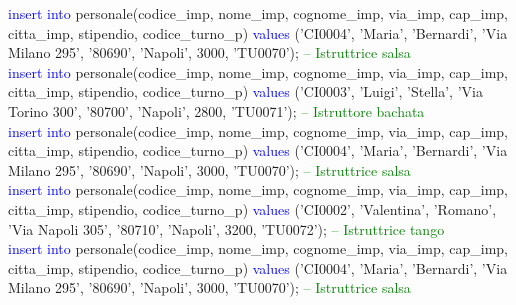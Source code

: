 \documentclass{article}
\begin{document}
\begin{flushleft}
{        \vspace{2mm}
        \hspace*{0.5em}\textcolor{blue}{insert into} personale(codice\_imp, nome\_imp, cognome\_imp, via\_imp, cap\_imp, \hspace*{0.5em}citta\_imp, stipendio, codice\_turno\_p) \textcolor{blue}{values} ('CI0004', 'Maria', 'Bernardi', 'Via\hspace*{0.5em} Milano 295', \hspace*{0.5em}'80690', 'Napoli', 3000, 'TU0070'); \hspace*{0.5em} \textcolor{green}{-- Istruttrice salsa} \\
        \hspace*{0.5em}\textcolor{blue}{insert into} personale(codice\_imp, nome\_imp, cognome\_imp, via\_imp, cap\_imp, \hspace*{0.5em}citta\_imp, stipendio, codice\_turno\_p) \textcolor{blue}{values} ('CI0003', 'Luigi', 'Stella', 'Via Torino 300', \hspace*{0.5em}'80700', 'Napoli', 2800, 'TU0071'); \hspace*{0.5em} \textcolor{green}{-- Istruttore bachata} \\
        \vspace{2mm}
        \hspace*{0.5em}\textcolor{blue}{insert into} personale(codice\_imp, nome\_imp, cognome\_imp, via\_imp, cap\_imp, \hspace*{0.5em}citta\_imp, stipendio, codice\_turno\_p) \textcolor{blue}{values} ('CI0004', 'Maria', 'Bernardi', 'Via\hspace*{0.5em} Milano 295', \hspace*{0.5em}'80690', 'Napoli', 3000, 'TU0070'); \hspace*{0.5em} \textcolor{green}{-- Istruttrice salsa} \\
        \hspace*{0.5em}\textcolor{blue}{insert into} personale(codice\_imp, nome\_imp, cognome\_imp, via\_imp, cap\_imp, \hspace*{0.5em}citta\_imp, stipendio, codice\_turno\_p) \textcolor{blue}{values} ('CI0002', 'Valentina', 'Romano', 'Via Napoli 305', \hspace*{0.5em}'80710', 'Napoli', 3200, 'TU0072'); \hspace*{0.5em} \textcolor{green}{-- Istruttrice tango} \\
        \vspace{2mm}
        \hspace*{0.5em}\textcolor{blue}{insert into} personale(codice\_imp, nome\_imp, cognome\_imp, via\_imp, cap\_imp, \hspace*{0.5em}citta\_imp, stipendio, codice\_turno\_p) \textcolor{blue}{values} ('CI0004', 'Maria', 'Bernardi', 'Via\hspace*{0.5em} Milano 295', \hspace*{0.5em}'80690', 'Napoli', 3000, 'TU0070'); \hspace*{0.5em} \textcolor{green}{-- Istruttrice salsa} \\
}
\end{flushleft}
\end{document}
